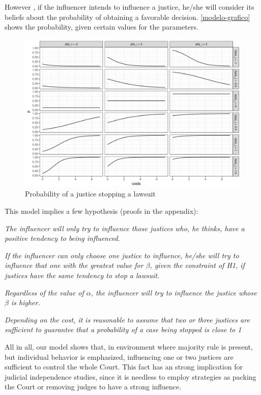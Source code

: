 \documentclass[12pt, a4paper]{article}
\newenvironment{hypothesis}
 {\enumerate[label=\textbf{H\arabic*.}, ref=H\arabic*]}
 {\endenumerate}
\begin{document}
However , if the influencer intends to influence a justice, he/she will consider its beliefs about the probability of obtaining a favorable decision. \autoref{modelo-grafico} shows the probability, given certain values for the parameters.


\begin{figure}[htb]
\label{modelo-grafico}
\caption{Probability of a justice stopping a lawsuit }
\includegraphics[scale=.8]{modelo.png}
\centering
\end{figure}

This model implies a few hypothesis (proofs in the appendix): \begin{hypothesis} \item \emph{The influencer will only try to influence those justices who, he thinks, have a positive tendency to being influenced.} \item \emph{If the influencer can only choose one justice to influence, he/she will try to influence that one with the greatest value for $\beta$, given the constraint of H1, if justices have the same tendency to stop a lawsuit. } \item \emph{Regardless of the value of $\alpha$, the influencer will try to influence the justice whose $\beta$ is higher.} \item \emph{Depending on the cost, it is reasonable to assume that two or three justices are sufficient to guarantee that a probability of a case being stopped is close to 1 }  \end{hypothesis}

All in all, our model shows that, in environment where majority rule is present, but individual behavior is emphasized, influencing one or two justices are sufficient to control the whole Court. This fact has an strong implication for judicial independence studies, since it is needless to employ strategies as packing the Court or removing judges to have a strong influence.
\end{document}
